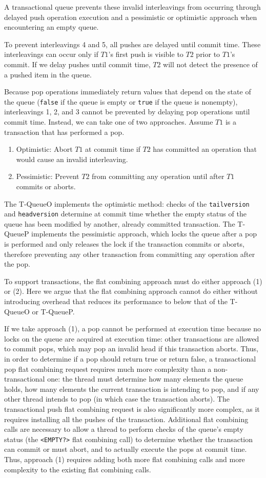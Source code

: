 A transactional queue prevents these invalid interleavings from occurring through delayed push operation execution and a pessimistic or optimistic approach when encountering an empty queue.

To prevent interleavings 4 and 5, all pushes are delayed until commit time. These interleavings can occur only if $T1$'s first push is visible to $T2$ prior to $T1$'s commit. If we delay pushes until commit time, $T2$ will not detect the presence of a pushed item in the queue.

Because pop operations immediately return values that depend on the state of the queue (\texttt{false} if the queue is empty or \texttt{true} if the queue is nonempty), interleavings 1, 2, and 3 cannot be prevented by delaying pop operations until commit time. Instead, we can take one of two approaches. Assume $T1$ is a transaction that has performed a pop.
\begin{enumerate}
    \item Optimistic: Abort $T1$ at commit time if $T2$ has committed an operation that would cause an invalid interleaving.
    \item Pessimistic: Prevent $T2$ from committing any operation until after $T1$ commits or aborts.
\end{enumerate}

The T-QueueO implements the optimistic method: checks of the \texttt{tailversion} and \texttt{headversion} determine at commit time whether the empty status of the queue has been modified by another, already committed transaction. The T-QueueP implements the pessimistic approach, which locks the queue after a pop is performed and only releases the lock if the transaction commits or aborts, therefore preventing any other transaction from committing any operation after the pop.

To support transactions, the flat combining approach must do either approach (1) or (2). Here we argue that the flat combining approach cannot do either without introducing overhead that reduces its performance to below that of the T-QueueO or T-QueueP.

If we take approach (1), a pop cannot be performed at execution time because no locks on the queue are acquired at execution time: other transactions are allowed to commit pops, which may pop an invalid head if this transaction aborts. Thus, in order to determine if a pop should return true or return false, a transactional pop flat combining request requires much more complexity than a non-transactional one: the thread must determine how many elements the queue holds, how many elements the current transaction is intending to pop, and if any other thread intends to pop (in which case the transaction aborts). The transactional push flat combining request is also significantly more complex, as it requires installing all the pushes of the transaction. Additional flat combining calls are necessary to allow a thread to perform checks of the queue's empty status (the \texttt{<EMPTY?>} flat combining call) to determine whether the transaction can commit or must abort, and to actually execute the pops at commit time. Thus, approach (1) requires adding both more flat combining calls and more complexity to the existing flat combining calls.

